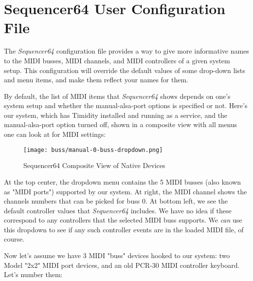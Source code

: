 %
%
%

\section{Sequencer64 User Configuration File}
\label{sec:seq64_usr_file}

   The \textsl{Sequencer64} configuration file provides a way to give more
   informative names to the MIDI busses, MIDI channels, and MIDI controllers of
   a given system setup.  This configuration will override the default values
   of some drop-down lists and menu items, and make them reflect your names for
   them.

   By default, the list of MIDI items that \textsl{Sequencer64} shows depends
   on one's system setup and whether the manual-alsa-port options is specified
   or not.  Here's our system, which has Timidity installed and running as a
   service, and the manual-alsa-port option turned off, shown in a composite
   view with all menus one can look at for MIDI settings:

\begin{figure}[H]
   \centering 
   \texttt{[image: buss/manual-0-buss-dropdown.png]}
   \caption{Sequencer64 Composite View of Native Devices}
   \label{fig:seq64_manual_0_buss_dropdown}
\end{figure}

   At the top center, the dropdown menu contains the 5 MIDI busses (also known
   as "MIDI ports") supported by our system.  At right, the MIDI channel shows
   the channels numbers that can be picked for buss 0.  At bottom left, we see
   the default controller values that \textsl{Sequencer64} includes.  We have
   no idea if these correspond to any controllers that the selected MIDI buss
   supports.  We \textsl{can} use this dropdown to see if any such controller
   events are in the loaded MIDI file, of course.

   Now let's assume we have 3 MIDI "buss" devices hooked to our system:
   two Model "2x2" MIDI port devices, and an old PCR-30 MIDI controller
   keyboard.  Let's number them:

